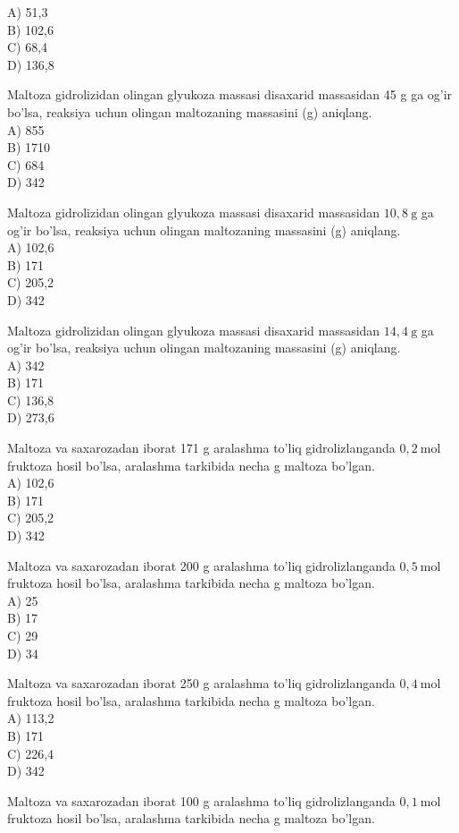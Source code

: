 A) 51,3\\
B) 102,6\\
C) 68,4\\
D) 136,8
  \item Maltoza gidrolizidan olingan glyukoza massasi disaxarid massasidan 45 g ga og'ir bo'lsa, reaksiya uchun olingan maltozaning massasini (g) aniqlang.\\
A) 855\\
B) 1710\\
C) 684\\
D) 342
  \item Maltoza gidrolizidan olingan glyukoza massasi disaxarid massasidan $10,8 \mathrm{~g}$ ga og'ir bo'lsa, reaksiya uchun olingan maltozaning massasini (g) aniqlang.\\
A) 102,6\\
B) 171\\
C) 205,2\\
D) 342
  \item Maltoza gidrolizidan olingan glyukoza massasi disaxarid massasidan $14,4 \mathrm{~g}$ ga og'ir bo'lsa, reaksiya uchun olingan maltozaning massasini (g) aniqlang.\\
A) 342\\
B) 171\\
C) 136,8\\
D) 273,6
  \item Maltoza va saxarozadan iborat 171 g aralashma to'liq gidrolizlanganda $0,2 \mathrm{~mol}$ fruktoza hosil bo'lsa, aralashma tarkibida necha g maltoza bo'lgan.\\
A) 102,6\\
B) 171\\
C) 205,2\\
D) 342
  \item Maltoza va saxarozadan iborat 200 g aralashma to'liq gidrolizlanganda $0,5 \mathrm{~mol}$ fruktoza hosil bo'lsa, aralashma tarkibida necha g maltoza bo'lgan.\\
A) 25\\
B) 17\\
C) 29\\
D) 34
  \item Maltoza va saxarozadan iborat 250 g aralashma to'liq gidrolizlanganda $0,4 \mathrm{~mol}$ fruktoza hosil bo'lsa, aralashma tarkibida necha g maltoza bo'lgan.\\
A) 113,2\\
B) 171\\
C) 226,4\\
D) 342
  \item Maltoza va saxarozadan iborat 100 g aralashma to'liq gidrolizlanganda $0,1 \mathrm{~mol}$ fruktoza hosil bo'lsa, aralashma tarkibida necha g maltoza bo'lgan.\\
